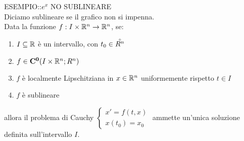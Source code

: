 ESEMPIO::$e^x$ NO SUBLINEARE\\
Diciamo sublineare se il grafico non si impenna.\\
\proposition
Data la funzione $f:I\times \mathbb{R}^n\to \mathbb{R}^n$, se:
\begin{enumerate}
	\item $I\subseteq \mathbb{R}$ è un intervallo, con $t_0\in\accentset{\circ}{R^n}$
	\item $f\in \mathbf{C^{0}}(I\times \mathbb{R}^n;R^n)$
	\item $f$ è localmente Lipschitziana in $x\in \mathbb{R}^n$ uniformemente rispetto $t\in I$
	\item $f$ è sublineare
\end{enumerate}
allora il problema di Cauchy $\left\{\begin{matrix} x'=f(t,x)\\x(t_0)=x_0\end{matrix}\right.$ ammette un'unica soluzione definita sull'intervallo $I$.
